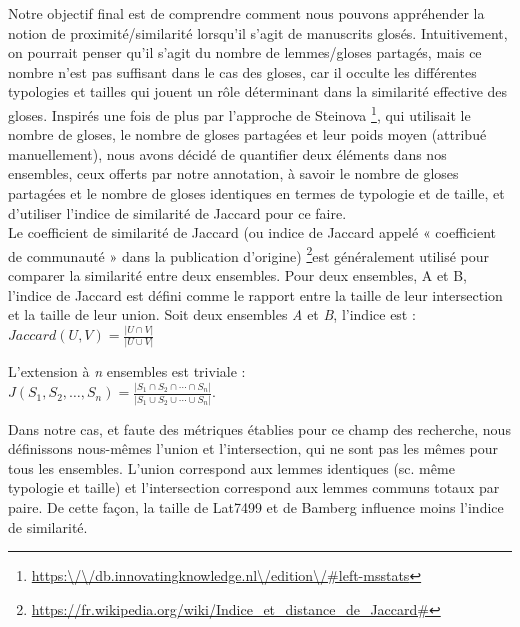 \documentclass[a4paper, twoside, 12pt]{book}
\begin{document}
{Notre objectif final est de comprendre comment nous pouvons appréhender la notion de proximité/similarité lorsqu'il s'agit de manuscrits glosés. Intuitivement, on pourrait penser qu'il s'agit du nombre de lemmes/gloses partagés, mais ce nombre n'est pas suffisant dans le cas des gloses, car il occulte les différentes typologies et tailles qui jouent un rôle déterminant dans la similarité effective des gloses. Inspirés une fois de plus par l'approche de Steinova \footnote{\url{https:\/\/db.innovatingknowledge.nl\/edition\/\#left-msstats}}, qui utilisait le nombre de gloses, le nombre de gloses partagées et leur poids moyen (attribué manuellement), nous avons décidé de quantifier deux éléments dans nos ensembles, ceux offerts par notre annotation, à savoir le nombre de gloses partagées et le nombre de gloses identiques en termes de typologie et de taille, et d'utiliser l'indice de similarité de Jaccard pour ce faire.\\

Le coefficient de similarité de Jaccard (ou indice de Jaccard  appelé « coefficient de communauté » dans la publication d'origine) \footnote{\url{https://fr.wikipedia.org/wiki/Indice\_et\_distance\_de\_Jaccard\#}}est généralement utilisé pour comparer la similarité entre deux ensembles. Pour deux ensembles, A et B, l'indice de Jaccard est défini comme le rapport entre la taille de leur intersection et la taille de leur union. Soit deux ensembles \textit{A} et \textit{B}, l'indice est :\\

\begin{math}
 Jaccard(U,V) = \frac{|U \cap V|}{|U \cup V|}
\end{math}

L'extension à \textit{n} ensembles est triviale :\\

\begin{math}
    J(S_1, S_2, \dotsc, S_n) = \frac{|S_1 \cap S_2 \cap \dotsb \cap S_n |}{|S_1 \cup S_2 \cup \dotsb \cup S_n |}.
\end{math}

Dans notre cas, et faute des métriques établies pour ce champ des recherche, nous définissons nous-mêmes l'union et l'intersection, qui ne sont pas les mêmes pour tous les ensembles. L'union correspond aux lemmes identiques (sc. même typologie et taille) et l'intersection correspond aux lemmes communs totaux par paire. De cette façon, la taille de Lat7499 et de Bamberg influence moins l'indice de similarité.\\

}
\end{document}
